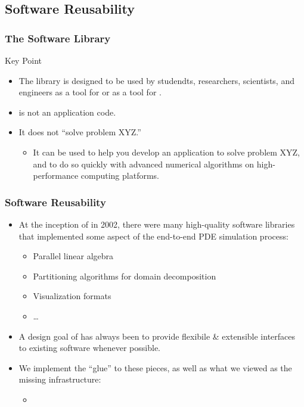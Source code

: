  

\subsection{Software Reusability}
\frame
{
  \frametitle{The \libmesh{} Software Library}

  \begin{block}{Key Point}
    \begin{itemize}
      \item The \libmesh{} library is designed to be used by studendts, researchers, scientists, and engineers as a tool for  or as a tool for .
      \item \libMesh{} is not an application code.
      \item It does not ``solve problem XYZ.''
        \begin{itemize}
          \item It can be used to help you develop an application to solve problem XYZ, and to do so quickly with advanced numerical algorithms on high-performance computing platforms.
        \end{itemize}
    \end{itemize}    
  \end{block}
} 



\frame
{
  \frametitle{Software Reusability}
  \begin{itemize}
    \item At the inception of \libMesh{} in 2002, there were many high-quality software libraries that implemented some aspect of the end-to-end PDE simulation process:
      \begin{itemize}
        \item Parallel linear algebra
        \item Partitioning algorithms for domain decomposition
        \item Visualization formats
        \item \ldots
      \end{itemize}
    \item A design goal of \libMesh{} has always been to provide flexibile \& extensible interfaces to existing software whenever possible.
    \item We implement the ``glue'' to these pieces, as well as what we viewed as the missing infrastructure:
      \begin{itemize}
        \item {}
      \end{itemize}          
  \end{itemize}  
}




